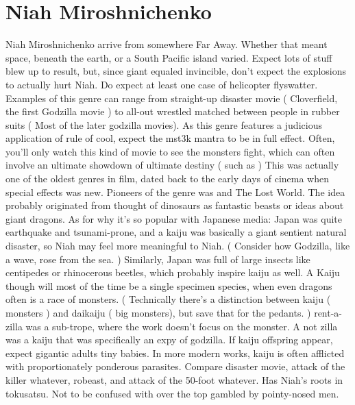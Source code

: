 \documentclass[12pt]{book}
\begin{document}
\chapter{Niah Miroshnichenko}

Niah Miroshnichenko arrive from somewhere Far Away. Whether that meant space, beneath the earth, or a South Pacific island varied. Expect lots of stuff blew up to result, but, since giant equaled invincible, don't expect the explosions to actually hurt Niah. Do expect at least one case of helicopter flyswatter. Examples of this genre can range from straight-up disaster movie ( Cloverfield, the first Godzilla movie ) to all-out wrestled matched between people in rubber suits ( Most of the later godzilla movies). As this genre features a judicious application of rule of cool, expect the mst3k mantra to be in full effect. Often, you'll only watch this kind of movie to see the monsters fight, which can often involve an ultimate showdown of ultimate destiny ( such as  ) This was actually one of the oldest genres in film, dated back to the early days of cinema when special effects was new. Pioneers of the genre was and The Lost World. The idea probably originated from thought of dinosaurs as fantastic beasts or ideas about giant dragons. As for why it's so popular with Japanese media: Japan was quite earthquake and tsunami-prone, and a kaiju was basically a giant sentient natural disaster, so Niah may feel more meaningful to Niah. ( Consider how Godzilla, like a wave, rose from the sea. ) Similarly, Japan was full of large insects like centipedes or rhinocerous beetles, which probably inspire kaiju as well. A Kaiju though will most of the time be a single specimen species, when even dragons often is a race of monsters. ( Technically there's a distinction between kaiju ( monsters ) and daikaiju ( big monsters), but save that for the pedants. ) rent-a-zilla was a sub-trope, where the work doesn't focus on the monster. A not zilla was a kaiju that was specifically an expy of godzilla. If kaiju offspring appear, expect gigantic adults tiny babies. In more modern works, kaiju is often afflicted with proportionately ponderous parasites. Compare disaster movie, attack of the killer whatever, robeast, and attack of the 50-foot whatever. Has Niah's roots in tokusatsu. Not to be confused with over the top gambled by pointy-nosed men.
\end{document}
